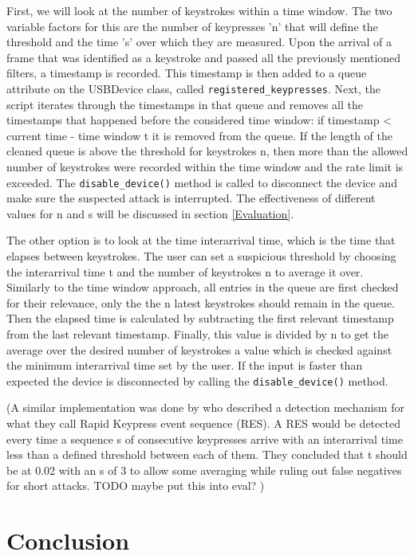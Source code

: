 First, we will look at the number of keystrokes within a time window. The two variable factors for this are the number of keypresses 'n' that will define the threshold and the time 's' over which they are measured. 
Upon the arrival of a frame that was identified as a keystroke and passed all the previously mentioned filters, a timestamp is recorded. This timestamp is then added to a queue attribute on the USBDevice class, called \verb|registered_keypresses|. Next, the script iterates through the timestamps in that queue and removes all the timestamps that happened before the considered time window: if timestamp < current time - time window t it is removed from the queue. If the length of the cleaned queue is above the threshold for keystrokes n, then more than the allowed number of keystrokes were recorded within the time window and the rate limit is exceeded. The \verb|disable_device()| method is called to disconnect the device and make sure the suspected attack is interrupted. The effectiveness of different values for n and s will be discussed in section \ref{Evaluation}. 


The other option is to look at the time interarrival time, which is the time that elapses between keystrokes. The user can set a suspicious threshold by choosing the interarrival time t and the number of keystrokes n to average it over. Similarly to the time window approach, all entries in the queue are first checked for their relevance, only the the n latest keystrokes should remain in the queue. Then the elapsed time is calculated by subtracting the first relevant timestamp from the last relevant timestamp. Finally, this value is divided by n to get the average over the desired number of keystrokes a value which is checked against the minimum interarrival time set by the user. If the input is faster than expected the device is disconnected by calling the \verb|disable_device()| method. 


(A similar implementation was done by \cite{neunerUSBlockBlockingUSBBased2018} who described a detection mechanism for what they call Rapid Keypress event sequence (RES). A RES would be detected every time a sequence s of consecutive keypresses arrive with an interarrival time less than a defined threshold between each of them. They concluded that t should be at 0.02 with an s of 3 to allow some averaging while ruling out false negatives for short attacks. TODO maybe put this into eval? )




\section{Conclusion}


